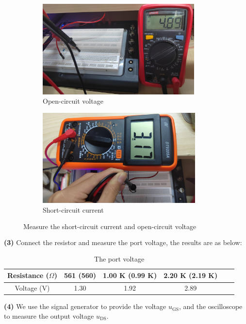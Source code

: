 \documentclass[UTF8]{report}
\theoremstyle{MyLineTheoremStyle} %
\theoremstyle{MyBlockTheoremStyle} %
\theoremstyle{MySubsubsectionStyle} %
\begin{document}
\begin{figure}[H]\centering
\begin{subfigure}[b]{0.5\columnwidth}\centering
    \includegraphics[height=140pt]{assets/Lab1/IMG_20241018_180909.jpg}
    \caption{Open-circuit voltage}
\end{subfigure}\hfill
\begin{subfigure}[b]{0.5\columnwidth}\centering
    \includegraphics[height=140pt]{assets/Lab1/IMG_20241018_175823.jpg}
    \caption{Short-circuit current}
\end{subfigure}
\caption{Measure the short-circuit current and open-circuit voltage}
\end{figure}

\noindent \textbf{(3) }
Connect the resistor and measure the port voltage, the results are as below:
\begin{table}[H]\centering
    \caption{The port voltage}
    \label{The port voltage}
\begin{tabular}{cccccc}\hline
    Resistance ($\Omega$) & 561 (560) & 1.00 K (0.99 K) & 2.20 K (2.19 K) \\
    \hline
    Voltage (V) & 1.30 & 1.92 & 2.89 \\
    \hline
\end{tabular}
\end{table}

\noindent \textbf{(4) }
We use the signal generator to provide the voltage $u_{\text{GS}}$, and the oscilloscope to measure the output voltage $u_{\text{DS}}$.
\end{document}
